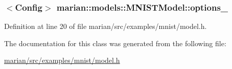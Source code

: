 \subsubsection[{\texorpdfstring{options\+\_\+}{options_}}]{$<${\bf Config}$>$ marian\+::models\+::\+M\+N\+I\+S\+T\+Model\+::options\+\_\+\hspace{0.3cm}{\ttfamily [private]}}\hypertarget{classmarian_1_1models_1_1MNISTModel_a89534bc9dc7dfea0acb2292be4037252}{}\label{classmarian_1_1models_1_1MNISTModel_a89534bc9dc7dfea0acb2292be4037252}


Definition at line 20 of file marian/src/examples/mnist/model.\+h.



The documentation for this class was generated from the following file\+:\begin{DoxyCompactItemize}
\item 
\hyperlink{marian_2src_2examples_2mnist_2model_8h}{marian/src/examples/mnist/model.\+h}\end{DoxyCompactItemize}
